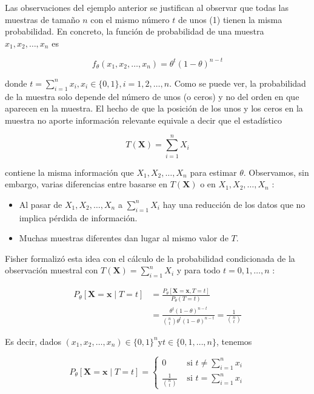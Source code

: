 \documentclass[
]{article}
\providecommand{\tightlist}{%
  \setlength{\itemsep}{0pt}\setlength{\parskip}{0pt}}
\begin{document}
Las observaciones del ejemplo anterior se justifican al observar que todas las muestras de tamaño \(n\) con el mismo número \(t\) de unos (1) tienen la misma probabilidad. En concreto, la función de probabilidad de una muestra \(x_{1}, x_{2}, \ldots, x_{n}\) es

\[
f_{\theta}\left(x_{1}, x_{2}, \ldots, x_{n}\right)=\theta^{t}(1-\theta)^{n-t}
\]

donde \(t=\sum_{i=1}^{n} x_{i}, x_{i} \in\{0,1\}, i=1,2, \ldots, n\).
Como se puede ver, la probabilidad de la muestra solo depende del número de unos (o ceros) y no del orden en que aparecen en la muestra. El hecho de que la posición de los unos y los ceros en la muestra no aporte información relevante equivale a decir que el estadístico

\[
T(\mathbf{X})=\sum_{i=1}^{n} X_{i}
\]

contiene la misma información que \(X_{1}, X_{2}, \ldots, X_{n}\) para estimar \(\theta\). Observamos, sin embargo, varias diferencias entre basarse en \(T(\mathbf{X})\) o en \(X_{1}, X_{2}, \ldots, X_{n}\) :

\begin{itemize}
\tightlist
\item
  Al pasar de \(X_{1}, X_{2}, \ldots, X_{n}\) a \(\sum_{i=1}^{n} X_{i}\) hay una reducción de los datos que no implica pérdida de información.
\item
  Muchas muestras diferentes dan lugar al mismo valor de \(T\).
\end{itemize}

Fisher formalizó esta idea con el cálculo de la probabilidad condicionada de la observación muestral con \(T(\mathbf{X})=\sum_{i=1}^{n} X_{i}\) y para todo \(t=0,1, \ldots, n\) :

\[
\begin{aligned}
P_{\theta}[\mathbf{X}=\mathbf{x} \mid T=t] & =\frac{P_{\theta}[\mathbf{X}=\mathbf{x}, T=t]}{P_{\theta}(T=t)} \\
& =\frac{\theta^{t}(1-\theta)^{n-t}}{\binom{n}{t} \theta^{t}(1-\theta)^{n-t}}=\frac{1}{\binom{n}{t}}
\end{aligned}
\]

Es decir, dados \(\left(x_{1}, x_{2}, \ldots, x_{n}\right) \in\{0,1\}^{n} \mathrm{y} t \in\{0,1, \ldots, n\}\), tenemos

\[
P_{\theta}[\mathbf{X}=\mathbf{x} \mid T=t]=\left\{\begin{array}{cc}
0 & \text { si } t \neq \sum_{i=1}^{n} x_{i} \\
\frac{1}{\binom{n}{t}} & \text { si } t=\sum_{i=1}^{n} x_{i}
\end{array}\right.
\]
\end{document}
